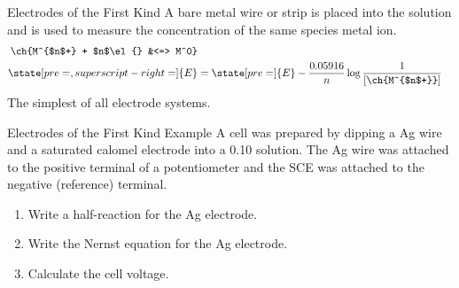 \documentclass[notes=only]{beamer}
\begin{document}

\begin{frame}{Electrodes of the First Kind}
		A bare metal wire or strip is placed into
			the solution and is used to measure the
			concentration of the same species metal
			ion.
			\begin{align*}
				\ch{M^{$n$+} + $n$\el{} &<=>
				M^0} \\
				\state[pre=,superscript-right=]{E}
				&= \state[pre=]{E} -
				\frac{0.05916}{n} \log
				\frac{1}{[\ch{M^{$n$+}}]}
			\end{align*}
		The simplest of all electrode systems.
\end{frame}


\begin{frame}[t]{Electrodes of the First Kind Example}
	A cell was prepared by dipping a Ag wire and a saturated calomel
	electrode into a \SI{0.10}{\Molar}  solution. The Ag wire was
	attached to the positive terminal of a potentiometer and the SCE was
	attached to the negative (reference) terminal.
	\begin{enumerate}
		\item Write a half-reaction for the Ag electrode.
		\item Write the Nernst equation for the Ag electrode.
		\item Calculate the cell voltage.
			\visible<2->{\textbf{Activity?}}
	\end{enumerate}

\end{frame}
\end{document}
